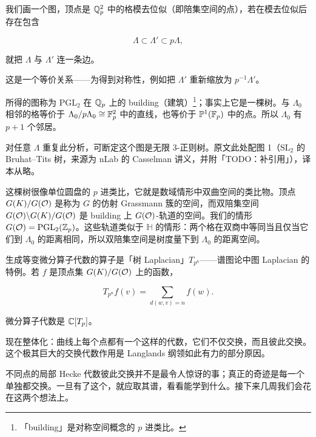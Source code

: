 我们画一个图，顶点是 $\mathbb{Q}_p^2$ 中的格模去位似（即陪集空间的点），若在模去位似后存在包含

\[\Lambda\subset\Lambda'\subset p\Lambda,\]

就把 $\Lambda$ 与 $\Lambda'$ 连一条边。

这是一个等价关系——为得到对称性，例如把 $\Lambda'$ 重新缩放为 $p^{-1}\Lambda'$。

所得的图称为 $\mathrm{PGL}_2$ 在 $\mathbb{Q}_p$ 上的 building（建筑）\footnote{「building」是对称空间概念的 $p$ 进类比。}；事实上它是一棵树。与 $\Lambda_0$ 相邻的格等价于 $\Lambda_0/p\Lambda_0\cong\mathbb{F}_p^2$ 中的直线，也等价于 $\mathbb{P}^1(\mathbb{F}_p)$ 中的点。所以 $\Lambda_0$ 有 $p+1$ 个邻居。

对任意 $\Lambda$ 重复此分析，可断定这个图是无限 $3$-正则树。原文此处配图 1（$\mathrm{SL}_2$ 的 Bruhat–Tits 树，来源为 nLab 的 Casselman 讲义，并附「TODO：补引用」），译本从略。

这棵树很像单位圆盘的 $p$ 进类比，它就是数域情形中双曲空间的类比物。顶点 $G(K)/G(\mathcal{O})$ 是称为 $G$ 的仿射 Grassmann 簇的空间，而双陪集空间 $G(\mathcal{O})\backslash G(K)/G(\mathcal{O})$ 是 building 上 $G(\mathcal{O})$-轨道的空间。我们的情形 $G(\mathcal{O})=\mathrm{PGL}_2(\mathbb{Z}_p)$。这些轨道类似于 $\mathbb{H}$ 的情形：两个格在双商中等同当且仅当它们到 $\Lambda_0$ 的距离相同，所以双陪集空间是树度量下到 $\Lambda_0$ 的距离空间。

生成等变微分算子代数的算子是「树 Laplacian」$T_{p^n}$——谱图论中图 Laplacian 的特例。若 $f$ 是顶点集 $G(K)/G(\mathcal{O})$ 上的函数，

\[T_{p^n}f(v)=\sum_{d(w,v)=n} f(w).\]

微分算子代数是 $\mathbb{C}[T_p]$。


现在整体化：曲线上每个点都有一个这样的代数，它们不仅交换，而且彼此交换。这个极其巨大的交换代数作用是 Langlands 纲领如此有力的部分原因。

不同点的局部 Hecke 代数彼此交换并不是最令人惊讶的事；真正的奇迹是每一个单独都交换。一旦有了这个，就应取其谱，看看能学到什么。接下来几周我们会花在这两个想法上。

